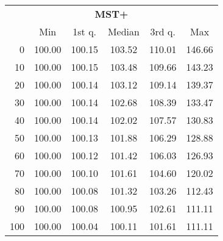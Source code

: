 \begin{tabular}{r|ccccc}
  \multicolumn{6}{c}{{\bf MST+}} \\
  & Min & 1st q. & Median & 3rd q. & Max \\ \hline\hline
  0 & 100.00 & 100.15 & 103.52 & 110.01 & 146.66
\\ 10 & 100.00 & 100.15 & 103.48 & 109.66 & 143.23
\\ 20 & 100.00 & 100.14 & 103.12 & 109.14 & 139.37
\\ 30 & 100.00 & 100.14 & 102.68 & 108.39 & 133.47
\\ 40 & 100.00 & 100.14 & 102.02 & 107.57 & 130.83
\\ 50 & 100.00 & 100.13 & 101.88 & 106.29 & 128.88
\\ 60 & 100.00 & 100.12 & 101.42 & 106.03 & 126.93
\\ 70 & 100.00 & 100.10 & 101.61 & 104.60 & 120.02
\\ 80 & 100.00 & 100.08 & 101.32 & 103.26 & 112.43
\\ 90 & 100.00 & 100.08 & 100.95 & 102.61 & 111.11
\\ 100 & 100.00 & 100.04 & 100.11 & 101.61 & 111.11
\end{tabular}
